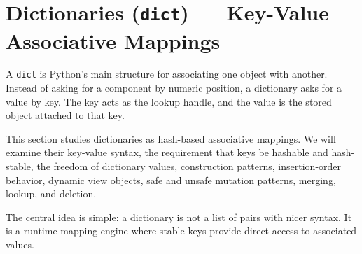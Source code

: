 \section{Dictionaries (\texttt{dict}) --- Key-Value Associative Mappings}

A \texttt{dict} is Python's main structure for associating one object with another. Instead of asking for a component by numeric position, a dictionary asks for a value by key. The key acts as the lookup handle, and the value is the stored object attached to that key.

This section studies dictionaries as hash-based associative mappings. We will examine their key-value syntax, the requirement that keys be hashable and hash-stable, the freedom of dictionary values, construction patterns, insertion-order behavior, dynamic view objects, safe and unsafe mutation patterns, merging, lookup, and deletion.

The central idea is simple: a dictionary is not a list of pairs with nicer syntax. It is a runtime mapping engine where stable keys provide direct access to associated values.